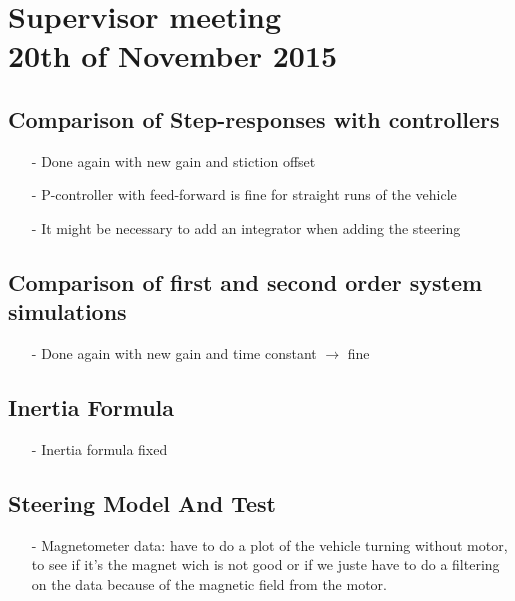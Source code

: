 

\renewcommand\chaptername{KAPITEL}
\renewcommand\contentsname{Indhold}
\renewcommand\figurename{Figur}
\renewcommand\tablename{Tabel}

\section*{Supervisor meeting\\ \small 20th of November 2015}

\subsection{Comparison of Step-responses with controllers}
\begin{itemize}
\item[-] Done again with new gain and stiction offset
\item[-] P-controller with feed-forward is fine for straight runs of the vehicle
\item[-] It might be necessary to add an integrator when adding the steering
\end{itemize}

\subsection{Comparison of first and second order system simulations}
\begin{itemize}
\item[-] Done again with new gain and time constant $\rightarrow$ fine
\end{itemize}

\subsection{Inertia Formula}
\begin{itemize}
\item[-] Inertia formula fixed
\end{itemize}

\subsection{Steering Model And Test}
\begin{itemize}
\item[-] Magnetometer data: have to do a plot of the vehicle turning without motor, to see if it's the magnet wich is not good or if we juste have to do a filtering on the data because of the magnetic field from the motor.
\end{itemize}


